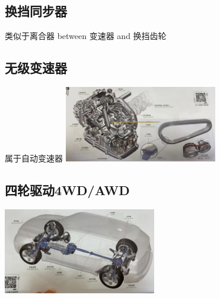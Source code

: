 	\subsection{换挡同步器}
		类似于离合器 between 变速器 and 换挡齿轮
	\subsection{无级变速器}
		属于自动变速器
		\includegraphics[width=0.5\textwidth]{3-8}
	\subsection{四轮驱动4WD/AWD}
		\includegraphics[width=0.5\textwidth]{3-9}
